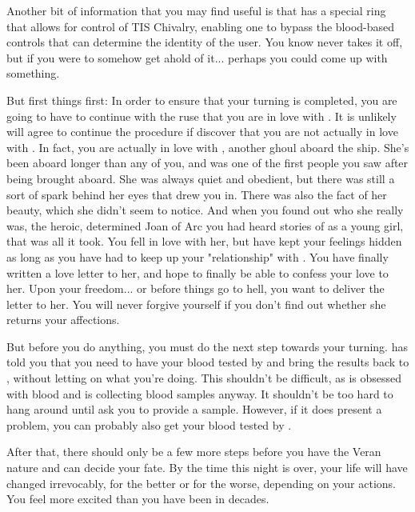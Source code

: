 \documentclass[char]{guildcamp4}
\begin{document}
Another bit of information that you may find useful is that \cVone{} has a special ring that allows for control of TIS Chivalry, enabling one to bypass the blood-based controls that can determine the identity of the user. You know \cVone{} never takes it off, but if you were to somehow get ahold of it... perhaps you could come up with something.

But first things first: In order to ensure that your turning is completed, you are going to have to continue with the ruse that you are in love with \cVtwo{}. It is unlikely \cVtwo{\they} will agree to continue the procedure if \cVtwo{\they} discover that you are not actually in love with \cVtwo{\them}. In fact, you are actually in love with \cJoan{}, another ghoul aboard the ship. She's been aboard longer than any of you, and was one of the first people you saw after being brought aboard. She was always quiet and obedient, but there was still a sort of spark behind her eyes that drew you in. There was also the fact of her beauty, which she didn't seem to notice. And when you found out who she really was, the heroic, determined Joan of Arc you had heard stories of as a young girl, that was all it took. You fell in love with her, but have kept your feelings hidden as long as you have had to keep up your "relationship" with \cVtwo{}. You have finally written a love letter to her, and hope to finally be able to confess your love to her. Upon your freedom... or before things go to hell, you want to deliver the letter to her. You will never forgive yourself if you don't find out whether she returns your affections.

But before you do anything, you must do the next step towards your turning. \cVtwo{} has told you that you need to have your blood tested by \cVthree{} and bring the results back to \cVtwo{\them}, without letting on what you're doing. This shouldn't be difficult, as \cVthree{} is obsessed with blood and is collecting blood samples anyway. It shouldn't be too hard to hang around \cVthree{\them} until \cVthree{\they} ask you to provide a sample. However, if it does present a problem, you can probably also get your blood tested by \cJames{}.

After that, there should only be a few more steps before you have the Veran nature and can decide your fate. By the time this night is over, your life will have changed irrevocably, for the better or for the worse, depending on your actions. You feel more excited than you have been in decades.
\end{document}
